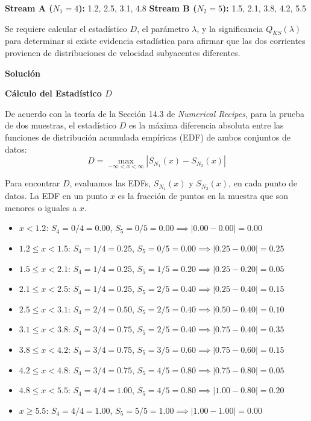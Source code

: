 \documentclass[a4paper]{article}
\begin{document}
\textbf{Stream A ($N_1 = 4$):} 1.2, 2.5, 3.1, 4.8
\textbf{Stream B ($N_2 = 5$):} 1.5, 2.1, 3.8, 4.2, 5.5

Se requiere calcular el estadístico $D$, el parámetro $\lambda$, y la significancia $Q_{KS}(\lambda)$ para determinar si existe evidencia estadística para afirmar que las dos corrientes provienen de distribuciones de velocidad subyacentes diferentes.

\textbf{Solución}

\textbf{Cálculo del Estadístico $D$}

De acuerdo con la teoría de la Sección 14.3 de \textit{Numerical Recipes}, para la prueba de dos muestras, el estadístico $D$ es la máxima diferencia absoluta entre las funciones de distribución acumulada empíricas (EDF) de ambos conjuntos de datos:
$$ D = \max_{-\infty < x < \infty} |S_{N_1}(x) - S_{N_2}(x)| $$

Para encontrar $D$, evaluamos las EDFs, $S_{N_1}(x)$ y $S_{N_2}(x)$, en cada punto de datos. La EDF en un punto $x$ es la fracción de puntos en la muestra que son menores o iguales a $x$.

\begin{itemize}
    \item $x < 1.2$: $S_4 = 0/4 = 0.00$, $S_5 = 0/5 = 0.00 \implies |0.00 - 0.00| = 0.00$
    \item $1.2 \leq x < 1.5$: $S_4 = 1/4 = 0.25$, $S_5 = 0/5 = 0.00 \implies |0.25 - 0.00| = 0.25$
    \item $1.5 \leq x < 2.1$: $S_4 = 1/4 = 0.25$, $S_5 = 1/5 = 0.20 \implies |0.25 - 0.20| = 0.05$
    \item $2.1 \leq x < 2.5$: $S_4 = 1/4 = 0.25$, $S_5 = 2/5 = 0.40 \implies |0.25 - 0.40| = 0.15$
    \item $2.5 \leq x < 3.1$: $S_4 = 2/4 = 0.50$, $S_5 = 2/5 = 0.40 \implies |0.50 - 0.40| = 0.10$
    \item $3.1 \leq x < 3.8$: $S_4 = 3/4 = 0.75$, $S_5 = 2/5 = 0.40 \implies |0.75 - 0.40| = 0.35$
    \item $3.8 \leq x < 4.2$: $S_4 = 3/4 = 0.75$, $S_5 = 3/5 = 0.60 \implies |0.75 - 0.60| = 0.15$
    \item $4.2 \leq x < 4.8$: $S_4 = 3/4 = 0.75$, $S_5 = 4/5 = 0.80 \implies |0.75 - 0.80| = 0.05$
    \item $4.8 \leq x < 5.5$: $S_4 = 4/4 = 1.00$, $S_5 = 4/5 = 0.80 \implies |1.00 - 0.80| = 0.20$
    \item $x \geq 5.5$: $S_4 = 4/4 = 1.00$, $S_5 = 5/5 = 1.00 \implies |1.00 - 1.00| = 0.00$
\end{itemize}
\end{document}
